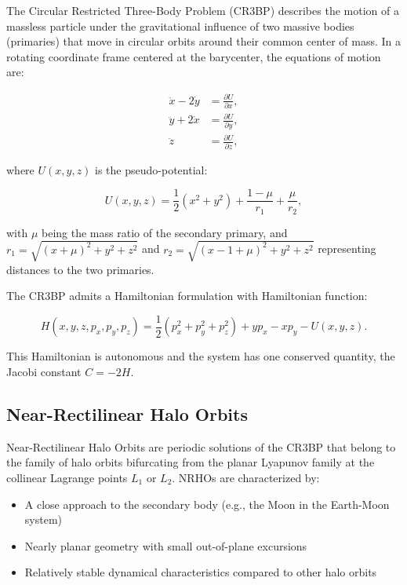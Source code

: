 \documentclass[review,onefignum,onetabnum]{siamart220329}
\begin{document}
The Circular Restricted Three-Body Problem (CR3BP) describes the motion of a
massless particle under the gravitational influence of two massive bodies (primaries)
that move in circular orbits around their common center of mass. In a rotating
coordinate frame centered at the barycenter, the equations of motion are:

\begin{equation}
\label{eq:cr3bp}
\begin{aligned}
    \ddot{x} - 2\dot{y} &= \frac{\partial U}{\partial x}, \\
    \ddot{y} + 2\dot{x} &= \frac{\partial U}{\partial y}, \\
    \ddot{z} &= \frac{\partial U}{\partial z},
\end{aligned}
\end{equation}

where $U(x,y,z)$ is the pseudo-potential:

\begin{equation}
U(x,y,z) = \frac{1}{2}(x^2 + y^2) + \frac{1-\mu}{r_1} + \frac{\mu}{r_2},
\end{equation}

with $\mu$ being the mass ratio of the secondary primary, and
$r_1 = \sqrt{(x+\mu)^2 + y^2 + z^2}$ and
$r_2 = \sqrt{(x-1+\mu)^2 + y^2 + z^2}$ representing distances to the two primaries.

The CR3BP admits a Hamiltonian formulation with Hamiltonian function:

\begin{equation}
H(x,y,z,p_x,p_y,p_z) = \frac{1}{2}(p_x^2 + p_y^2 + p_z^2) + yp_x - xp_y - U(x,y,z).
\end{equation}

This Hamiltonian is autonomous and the system has one conserved quantity, the
Jacobi constant $C = -2H$.

\subsection{Near-Rectilinear Halo Orbits}

Near-Rectilinear Halo Orbits are periodic solutions of the CR3BP that belong to
the family of halo orbits bifurcating from the planar Lyapunov family at the
collinear Lagrange points $L_1$ or $L_2$. NRHOs are characterized by:

\begin{itemize}
    \item A close approach to the secondary body (e.g., the Moon in the Earth-Moon system)
    \item Nearly planar geometry with small out-of-plane excursions
    \item Relatively stable dynamical characteristics compared to other halo orbits
\end{itemize}
\end{document}
